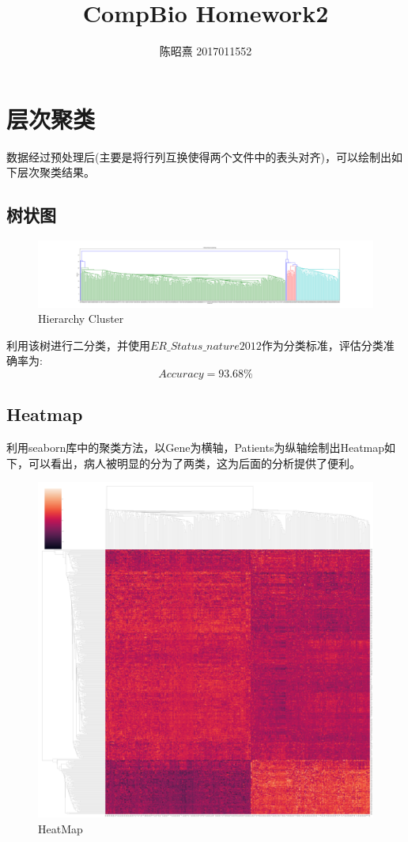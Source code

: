 \documentclass[UTF8]{ctexart}
\begin{document}
\title{CompBio Homework2}
\author{陈昭熹 2017011552}
\maketitle
\tableofcontents
\newpage
\section{层次聚类}
数据经过预处理后(主要是将行列互换使得两个文件中的表头对齐)，可以绘制出如下层次聚类结果。
\subsection{树状图}
\begin{figure}[H]
    \centering
    \includegraphics[scale=0.1]{../HClust.png}
\caption{Hierarchy Cluster}
\end{figure}

利用该树进行二分类，并使用$ER\_Status\_nature2012$作为分类标准，评估分类准确率为:
\begin{equation}
    Accuracy = 93.68\%
\end{equation}
\subsection{Heatmap}
利用seaborn库中的聚类方法，以Gene为横轴，Patients为纵轴绘制出Heatmap如下，可以看出，病人被明显的分为了两类，这为后面的分析提供了便利。
\begin{figure}[H]
    \centering
    \includegraphics[scale=0.08]{../heatmap.png}
    \caption{HeatMap}
\end{figure}
\end{document}
